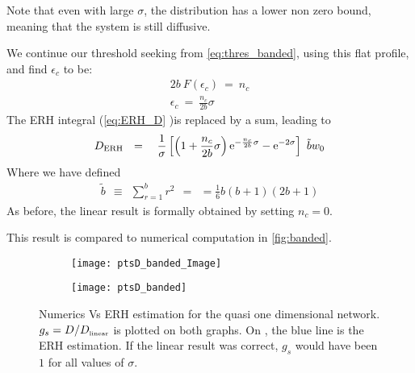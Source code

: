 Note that even with large $\sigma$, the distribution has a lower non zero bound, meaning that the system is still diffusive.


We continue our threshold seeking from \autoref{eq:thres_banded}, using this 
flat profile, and find $\epsilon_c$ to be:
%
\begin{align}
2b\ F(\epsilon_c) \ =\ n_c \\
\epsilon_c\ = \ \frac{n_c}{2b}\sigma
\end{align}
%
The ERH integral (\autoref{eq:ERH_D} )is replaced by a sum, leading to
\begin{align}
D_{\text{ERH}} \ \ = \ \ 
\ \frac{1}{\sigma}\left[ 
\left(1+\frac{n_c}{2b}\sigma\right)\eexp{-\frac{n_c}{2b}\sigma} - \eexp{-2\sigma}
\right] \ \tilde{b} w_0
\end{align}
Where we have defined
%
\begin{align}
\tilde{b} \ \ \equiv \ \ \sum_{r=1}^b r^2 \ \ = \ \ = \frac{1}{6}b(b+1)(2b+1)
\end{align}
%
As before, the linear result is formally obtained by setting $n_c=0$.

This result is compared to numerical computation in \autoref{fig:banded}.

\begin{figure}
\begin{subfigure}{0.49\textwidth}
\texttt{[image: ptsD\_banded\_Image]}
\label{fig:band_image}
\end{subfigure}
\begin{subfigure}{0.49\textwidth}
\texttt{[image: ptsD\_banded]}
\label{fig:band_b10}
\end{subfigure}
\caption[Banded network]{Numerics Vs ERH estimation for the quasi one dimensional network. $g_s = D/D_{\mbox{\tiny linear}}$ is plotted on both graphs.
On \subref{fig:band_b10}, the blue line is the ERH estimation. If the
linear result was correct, $g_s$ would have been $1$ for all values of $\sigma$.}
\label{fig:banded}
\end{figure}
